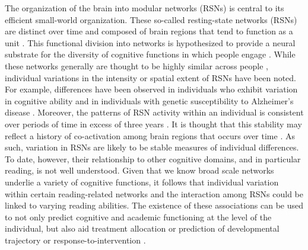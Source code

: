 The organization of the brain into modular networks (RSNs) is central to its efficient small-world organization. These so-called resting-state networks (RSNs) are distinct over time and composed of brain regions that tend to function as a unit \citep{DeLuca2006, Smith2009, Yeo2011}. This functional division into networks is hypothesized to provide a neural substrate for the diversity of cognitive functions in which people engage \citep{Yeo2014}. While these networks generally are thought to be highly similar across people \citep{Damoiseaux2006}, individual variations in the intensity or spatial extent of RSNs have been noted. For example, differences have been observed in individuals who exhibit variation in cognitive ability \citep{Reineberg2015, Tian2013} and in individuals with genetic susceptibility to Alzheimer’s disease \citep{Filippini2009}. Moreover, the patterns of RSN activity within an individual is consistent over periods of time in excess of three years \citep{Choe2015}. It is thought that this stability may reflect a history of co-activation among brain regions that occurs over time \citep{Power2010}. As such, variation in RSNs are likely to be stable measures of individual differences. To date, however, their relationship to other cognitive domains, and in particular reading, is not well understood.  Given that we know broad scale networks underlie a variety of cognitive functions, it follows that individual variation within certain reading-related networks and the interaction among RSNs could be linked to varying reading abilities. The existence of these associations can be used to not only predict cognitive and academic functioning at the level of the individual, but also aid treatment allocation or prediction of developmental trajectory \citep{Mattfeld2014} or response-to-intervention \citep{Crowther2015, Whitfield-Gabrieli2015}. 

